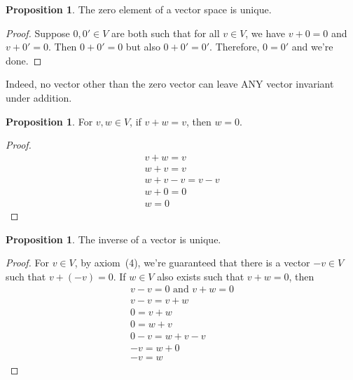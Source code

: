 \documentclass[11pt, reqno]{amsart}
\theoremstyle{definition} %
\newtheorem{proposition}[theorem]{Proposition}
\begin{document}
\begin{proposition}
    The zero element of a vector space is unique.
    \begin{proof}
        Suppose $0,0'\in V$ are both such that for all $v\in V$, we have $v+0=0$ and $v+0'=0$. Then $0+0'=0$ but also $0+0'=0'$. Therefore, $0=0'$ and we're done.
    \end{proof}
\end{proposition}

Indeed, no vector other than the zero vector can leave ANY vector invariant under addition.

\begin{proposition}
    For $v,w\in V$, if $v+w=v$, then $w=0$.
    \begin{proof}
        \begin{equation}
            \begin{gathered}
                v+w=v\\
                w+v=v\\
                w+v-v=v-v\\
                w+0=0\\
                w=0
            \end{gathered}
        \end{equation}
    \end{proof}
\end{proposition}

\begin{proposition}\label{inv}
    The inverse of a vector is unique.
    \begin{proof}
        For $v\in V$, by axiom~(4), we're guaranteed that there is a vector $-v\in V$ such that $v+(-v)=0$. If $w\in V$ also exists such that $v+w=0$, then 
        \begin{equation}
            \begin{gathered}
            v-v=0\text{ and }v+w=0\\
            v-v=v+w\\
            0=v+w\\
            0=w+v\\
            0-v=w+v-v\\
            -v=w+0\\
            -v=w
            \end{gathered}
        \end{equation}
    \end{proof}
\end{proposition}
\end{document}

